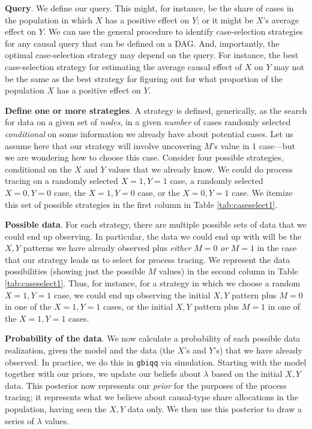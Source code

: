 \documentclass[12pt,]{book}
\begin{document}
\textbf{Query}. We define our query. This might, for instance, be the share of cases in the population in which \(X\) has a positive effect on \(Y\); or it might be \(X\)'s average effect on \(Y\). We can use the general procedure to identify case-selection strategies for any causal query that can be defined on a DAG. And, importantly, the optimal case-selection strategy may depend on the query. For instance, the best case-selection strategy for estimating the average causal effect of \(X\) on \(Y\) may not be the same as the best strategy for figuring out for what proportion of the population \(X\) has a positive effect on \(Y\).

\textbf{Define one or more strategies}. A strategy is defined, generically, as the search for data on a given set of \emph{nodes}, in a given \emph{number} of cases randomly selected \emph{conditional} on some information we already have about potential cases. Let us assume here that our strategy will involve uncovering \(M\)'s value in 1 case---but we are wondering how to choose this case. Consider four possible strategies, conditional on the \(X\) and \(Y\) values that we already know. We could do process tracing on a randomly selected \(X=1, Y=1\) case, a randomly selected \(X=0, Y=0\) case, the \(X=1, Y=0\) case, or the \(X=0, Y=1\) case. We itemize this set of possible strategies in the first column in Table \ref{tab:caseselect1}.

\textbf{Possible data}. For each strategy, there are multiple possible sets of data that we could end up observing. In particular, the data we could end up with will be the \(X,Y\) patterns we have already observed plus \emph{either} \(M=0\) \emph{or} \(M=1\) in the case that our strategy leads us to select for process tracing. We represent the data possibilities (showing just the possible \(M\) values) in the second column in Table \ref{tab:caseselect1}. Thus, for instance, for a strategy in which we choose a random \(X=1, Y=1\) case, we could end up observing the initial \(X,Y\) pattern plus \(M=0\) in one of the \(X=1, Y=1\) cases, or the initial \(X,Y\) pattern plus \(M=1\) in one of the \(X=1, Y=1\) cases.

\textbf{Probability of the data}. We now calculate a probability of each possible data realization, given the model and the data (the \(X\)'s and \(Y\)'s) that we have already observed. In practice, we do this in \texttt{gbiqq} via simulation. Starting with the model together with our priors, we update our beliefs about \(\lambda\) based on the initial \(X,Y\) data. This posterior now represents our \emph{prior} for the purposes of the process tracing; it represents what we believe about causal-type share allocations in the population, having seen the \(X,Y\) data only. We then use this posterior to draw a series of \(\lambda\) values.
\end{document}
